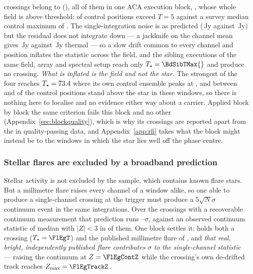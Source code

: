 \BdNCross{} crossings belong to \BdStar{} (\BdAlias), all of them in one ACA
execution block, \texttt{\BdBlock}, whose whole field is above
threshold: \BdNCtrlAbove{} of \BdNCtrl{} control positions exceed $T=5$
against a survey median control maximum of \BdSurvCtrlMed. The
single-integration noise is as predicted (\BdRmsMeas\,Jy against
\BdRmsPred\,Jy) but the residual does not integrate down --- a jackknife on
the channel mean gives \BdJack\,Jy against \BdThermal\,Jy thermal --- so a
slow drift common to every channel and position inflates the statistic across
the field, and the \BdNSibling{} sibling executions of the same field, array
and spectral setup reach only $T_\star=\BdSibTMax{}$ and produce no crossing.
\emph{What is inflated is the field and not the star.} The strongest of the
four reaches $T_\star=73.4$ where its own control ensemble peaks at
\EvFlagCtrlAtHi, and between \EvFlagNgeLo{} and \EvFlagNgeHi{} of the
\BdNCtrl{} control positions stand above the star in these windows, so there
is nothing here to localise and no evidence either way about a carrier.
Applied block by block the same criterion fails this block and no other
(Appendix~\ref{sec:blockquality}), which is why its \BdNCross{} crossings are
reported apart from the \EvNCrossQp{} in quality-passing data, and
Appendix~\ref{app:rfi} takes what the block might instead be to the windows
in which the star lies well off the phase centre.

\subsubsection{Stellar flares are excluded by a broadband prediction}

Stellar activity is not excluded by the sample, which contains known flare
stars. But a millimetre flare raises every channel of a
window alike, so one able to produce a single-channel crossing at the trigger
must produce a $5\sqrt{N}\sigma$ continuum event in the same integrations.
Over the \FlNCont{} crossings with a recoverable continuum measurement that
prediction runs \FlPredLo--\FlPredHi$\sigma$, against an observed continuum
statistic of median \FlObsMed{} with $|Z|<3$ in \FlNQuiet{} of them. One
block settles it: \FlEgStar{} \texttt{\FlEgEb} holds both a crossing
($T_\star=\FlEgT$) and the published millimetre flare of
\citet{MacGregor2020}, and \emph{that real, bright, independently published
flare contributes \FlEgContrib$\sigma$ to the single-channel statistic} ---
raising the continuum at $Z=\FlEgContZ$ while the crossing's own de-drifted
track reaches $Z_{\max}=\FlEgTrackZ$.

